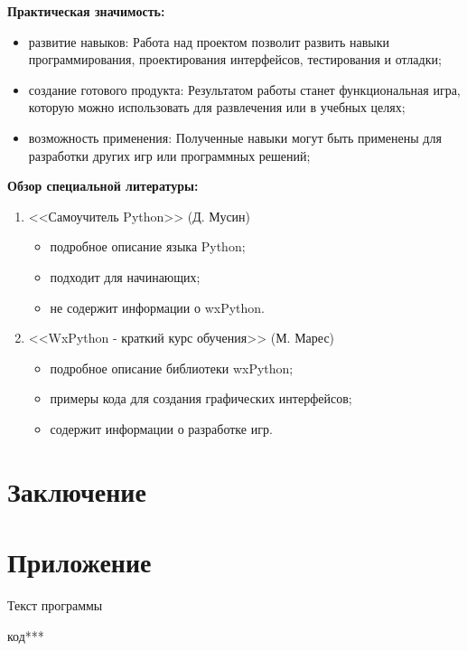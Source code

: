 \documentclass[14pt, oneside]{altsu-report}
\begin{document}
\textbf{Практическая значимость:}
\begin{itemize}
\item развитие навыков: Работа над проектом позволит развить навыки программирования, проектирования интерфейсов, тестирования и отладки;
\item создание готового продукта: Результатом работы станет функциональная игра, которую можно использовать для развлечения или в учебных целях;
\item возможность применения: Полученные навыки могут быть применены для разработки других игр или программных решений;
\end{itemize}

\textbf{Обзор специальной литературы:}
\begin{enumerate}
\item <<Самоучитель Python>> (Д. Мусин)
\begin{itemize}
    \item подробное описание языка Python;
    \item подходит для начинающих;
    \item не содержит информации о wxPython.
\end{itemize}
\item <<WxPython - краткий курс обучения>> (М. Марес)
    \begin{itemize}
        \item подробное описание библиотеки wxPython;
        \item примеры кода для создания графических интерфейсов;
        \item содержит информации о разработке игр.
    \end{itemize}
\end{enumerate}




\chapter*{Заключение}

\newpage
{}
\printbibliography[title={Список использованной литературы}]
\nocite{*}

\appendix
\newpage
\chapter*{\raggedleft\label{appendix1}Приложение}

\begin{center}
\label{code:appendix}Текст программы
\end{center}

\begin{code}
код***
\end{code}
\end{document}
